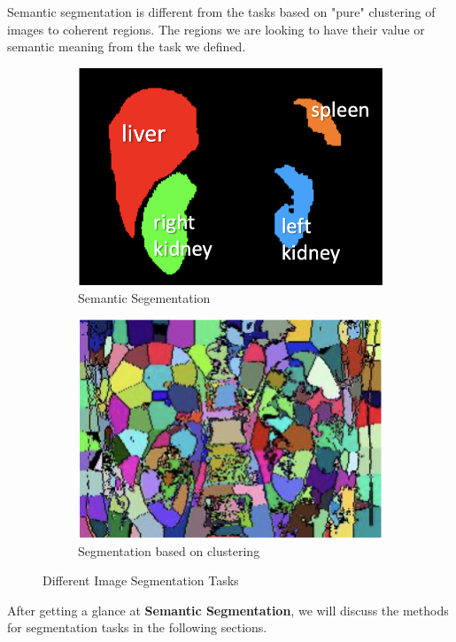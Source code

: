\begin{note}
    Semantic segmentation is different from the tasks based on "pure" clustering of images to coherent regions. The regions we are looking to have their value or semantic meaning from the task we defined.
\end{note}
\begin{figure}[H]
    \centering
    \begin{subfigure}[b]{0.47\textwidth}
        \centering
        \includegraphics[width=\textwidth]{./figures/semantic-segmentation.png}
        \caption{Semantic Segementation}
        \label{fig:semantic-segmentation}
    \end{subfigure}
    \hfill
    \begin{subfigure}[b]{0.47\textwidth}
        \centering
        \includegraphics[width=\textwidth]{./figures/clustering.png}
        \caption{Segmentation based on clustering}
        \label{fig:normal-segmentation}
    \end{subfigure}
       \caption{Different Image Segmentation Tasks \cite{segmentation-mli}}
       \label{fig:segmentations}
\end{figure}
\noindent After getting a glance at \textbf{Semantic Segmentation}, we will discuss the methods for segmentation tasks in the following sections.
